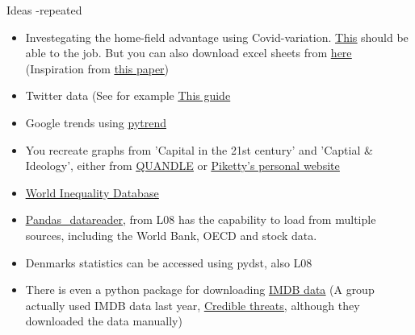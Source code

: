 \documentclass[10pt,danish,t,10pt]{beamer}
\begin{document}
\begin{frame}{Ideas -repeated}
    \begin{itemize}
        \item Investegating the home-field advantage using Covid-variation. \href{https://understat.readthedocs.io/en/latest/}{\underline{This}} should be able to the job. But you can also download excel sheets from \href{https://www.football-data.co.uk/data.php}{\underline{here}} (Inspiration from \href{http://ftp.iza.org/dp13578.pdf}{\underline{this paper}})
        \item Twitter data (See for example \href{https://www.toptal.com/python/twitter-data-mining-using-python}{\underline{This guide}}
        \item Google trends using \href{https://towardsdatascience.com/google-trends-api-for-python-a84bc25db88f}{\underline{pytrend}}
        \item You recreate graphs from 'Capital in the 21st century' and 'Captial \& Ideology', either from  \href{https://www.quandl.com/data/PIKETTY-Thomas-Piketty}{\underline{QUANDLE}} or \href{http://piketty.pse.ens.fr/en/ideology}{\underline{Piketty's personal website}}
        \item \href{https://wid.world/data/}{\underline{World Inequality Database}}
        \item \href{https://pandas-datareader.readthedocs.io/en/latest/remote_data.html}{\underline{Pandas\_datareader}}, from L08 has the capability to load from multiple sources, including the World Bank, OECD and stock data. 
        \item Denmarks statistics can be accessed using pydst, also L08
        \item There is even a python package for downloading \href{https://imdbpy.github.io/}{\underline{IMDB data}} (A group actually used IMDB data last year, \href{https://github.com/NumEconCopenhagen/projects-2019-credible-threats/tree/master/dataproject}{\underline{Credible threats}}, although they downloaded the data manually)
    \end{itemize}
\end{frame}
\end{document}
